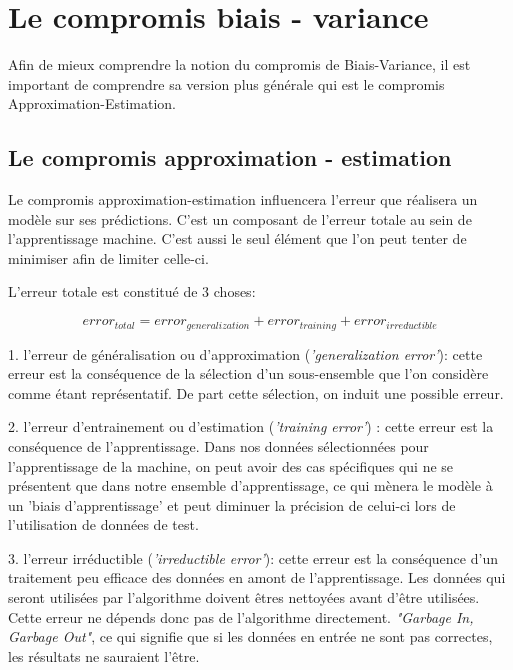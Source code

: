 \documentclass[a4paper]{article}
\begin{document}
\newpage

\section{Le compromis biais - variance}
\label{B-V}

Afin de mieux comprendre la notion du compromis de Biais-Variance, il est important de comprendre sa version plus générale qui est le compromis Approximation-Estimation.

\subsection{Le compromis approximation - estimation}
\label{A-E}

Le compromis approximation-estimation influencera l'erreur que réalisera un modèle sur ses prédictions. C'est un composant de l'erreur totale au sein de l'apprentissage machine. C'est aussi le seul élément que l'on peut tenter de minimiser afin de limiter celle-ci. \newline


L'erreur totale est constitué de 3 choses: \newline

\[ error_{total} = error_{generalization} + error_{training} + error_{irreductible} \]

1. l'erreur de généralisation ou d'approximation (\textit{'generalization error'}): cette erreur est la conséquence de la sélection d'un sous-ensemble que l'on considère comme étant représentatif. De part cette sélection, on induit une possible erreur.\newline

2. l'erreur d'entrainement ou d'estimation (\textit{'training error'}) : cette erreur est la conséquence de l'apprentissage. Dans nos données sélectionnées pour l'apprentissage de la machine, on peut avoir des cas spécifiques qui ne se présentent que dans notre ensemble d'apprentissage, ce qui mènera le modèle à un 'biais d'apprentissage' et peut diminuer la précision de celui-ci lors de l'utilisation de données de test.\newline

3. l'erreur irréductible (\textit{'irreductible error'}): cette erreur est la conséquence d'un traitement peu efficace des données en amont de l'apprentissage. Les données qui seront utilisées par l'algorithme doivent êtres nettoyées avant d'être utilisées. Cette erreur ne dépends donc pas de l'algorithme directement.\newline
 \textit{"Garbage In, Garbage Out"}, ce qui signifie que si les données en entrée ne sont pas correctes, les résultats ne sauraient l'être. \newline
\end{document}
